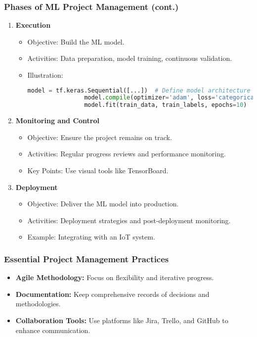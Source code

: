 \documentclass[aspectratio=169]{beamer}
\begin{document}
\begin{frame}[fragile]
    \frametitle{Phases of ML Project Management (cont.)}
    \begin{enumerate}[resume]
        \item \textbf{Execution}
            \begin{itemize}
                \item Objective: Build the ML model.
                \item Activities: Data preparation, model training, continuous validation.
                \item Illustration:
                \begin{lstlisting}[language=Python]
                model = tf.keras.Sequential([...])  # Define model architecture
                model.compile(optimizer='adam', loss='categorical_crossentropy', metrics=['accuracy'])
                model.fit(train_data, train_labels, epochs=10)  # Train the model
                \end{lstlisting}
            \end{itemize}

        \item \textbf{Monitoring and Control}
            \begin{itemize}
                \item Objective: Ensure the project remains on track.
                \item Activities: Regular progress reviews and performance monitoring.
                \item Key Points: Use visual tools like TensorBoard.
            \end{itemize}

        \item \textbf{Deployment}
            \begin{itemize}
                \item Objective: Deliver the ML model into production.
                \item Activities: Deployment strategies and post-deployment monitoring.
                \item Example: Integrating with an IoT system.
            \end{itemize}
    \end{enumerate}
\end{frame}

\begin{frame}
    \frametitle{Essential Project Management Practices}
    \begin{itemize}
        \item \textbf{Agile Methodology:} Focus on flexibility and iterative progress.
        \item \textbf{Documentation:} Keep comprehensive records of decisions and methodologies.
        \item \textbf{Collaboration Tools:} Use platforms like Jira, Trello, and GitHub to enhance communication.
    \end{itemize}
\end{frame}
\end{document}
